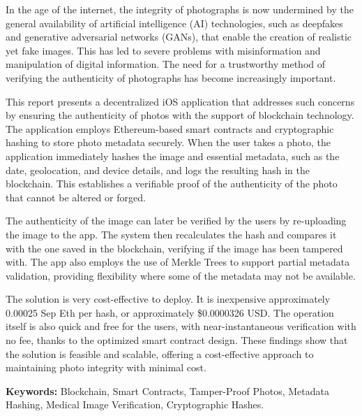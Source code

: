 In the age of the internet, the integrity of photographs is now undermined by the general availability of artificial intelligence (AI) technologies, such as deepfakes and generative adversarial networks (GANs), that enable the creation of realistic yet fake images. This has led to severe problems with misinformation and manipulation of digital information. The need for a trustworthy method of verifying the authenticity of photographs has become increasingly important.

This report presents a decentralized iOS application that addresses such concerns by ensuring the authenticity of photos with the support of blockchain technology. The application employs Ethereum-based smart contracts and cryptographic hashing to store photo metadata securely. When the user takes a photo, the application immediately hashes the image and essential metadata, such as the date, geolocation, and device details, and logs the resulting hash in the blockchain. This establishes a verifiable proof of the authenticity of the photo that cannot be altered or forged.

The authenticity of the image can later be verified by the users by re-uploading the image to the app. The system then recalculates the hash and compares it with the one saved in the blockchain, verifying if the image has been tampered with. The app also employs the use of Merkle Trees to support partial metadata validation, providing flexibility where some of the metadata may not be available.

The solution is very cost-effective to deploy. It is inexpensive approximately 0.00025 Sep Eth per hash, or approximately \$0.0000326 USD. The operation itself is also quick and free for the users, with near-instantaneous verification with no fee, thanks to the optimized smart contract design. These findings show that the solution is feasible and scalable, offering a cost-effective approach to maintaining photo integrity with minimal cost.

{\bf Keywords:} Blockchain, Smart Contracts, Tamper-Proof Photos, Metadata Hashing, Medical Image Verification, Cryptographic Hashes.

